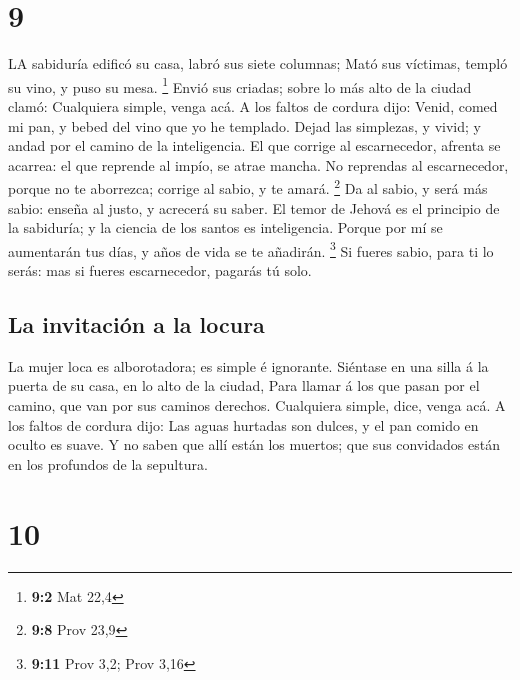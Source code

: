 \hypertarget{section-8}{%
\section{9}\label{section-8}}

 LA sabiduría edificó su casa, labró sus siete columnas;
 Mató sus víctimas, templó su vino, y puso su mesa.
\footnote{\textbf{9:2} Mat 22,4}  Envió sus criadas; sobre
lo más alto de la ciudad clamó:  Cualquiera simple, venga
acá. A los faltos de cordura dijo:  Venid, comed mi pan, y
bebed del vino que yo he templado.  Dejad las simplezas, y
vivid; y andad por el camino de la inteligencia.  El que
corrige al escarnecedor, afrenta se acarrea: el que reprende al impío,
se atrae mancha.  No reprendas al escarnecedor, porque no te
aborrezca; corrige al sabio, y te amará. \footnote{\textbf{9:8} Prov
  23,9}  Da al sabio, y será más sabio: enseña al justo, y
acrecerá su saber.  El temor de Jehová es el principio de
la sabiduría; y la ciencia de los santos es inteligencia. 
Porque por mí se aumentarán tus días, y años de vida se te añadirán.
\footnote{\textbf{9:11} Prov 3,2; Prov 3,16}  Si fueres
sabio, para ti lo serás: mas si fueres escarnecedor, pagarás tú solo.

\hypertarget{la-invitaciuxf3n-a-la-locura}{%
\subsection{La invitación a la
locura}\label{la-invitaciuxf3n-a-la-locura}}

 La mujer loca es alborotadora; es simple é ignorante.
 Siéntase en una silla á la puerta de su casa, en lo alto
de la ciudad,  Para llamar á los que pasan por el camino,
que van por sus caminos derechos.  Cualquiera simple, dice,
venga acá. A los faltos de cordura dijo:  Las aguas
hurtadas son dulces, y el pan comido en oculto es suave.  Y
no saben que allí están los muertos; que sus convidados están en los
profundos de la sepultura.

\hypertarget{section-9}{%
\section{10}\label{section-9}}

